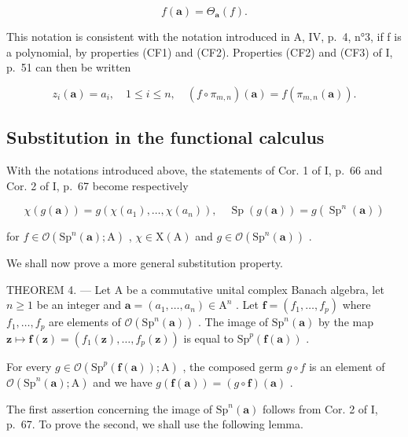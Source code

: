 \[
f (\boldsymbol {a}) = \Theta_ {\boldsymbol {a}} (f).\tag{6}
\]

This notation is consistent with the notation introduced in A, IV, p.~4, n°3, if f is a polynomial, by properties (CF1) and (CF2). Properties (CF2) and (CF3) of I, p.~51 can then be written

\[
z _ {i} (\boldsymbol {a}) = a _ {i}, \quad 1 \leqslant i \leqslant n, \quad (f \circ \pi_ {m, n}) (\boldsymbol {a}) = f (\pi_ {m, n} (\boldsymbol {a})).
\]

\subsection{Substitution in the functional calculus}

With the notations introduced above, the statements of Cor. 1 of I, p.~66 and Cor. 2 of I, p.~67 become respectively

\[
\chi (g (\boldsymbol {a})) = g \left(\chi \left(a _ {1}\right), \dots , \chi \left(a _ {n}\right)\right), \quad \operatorname{Sp} (g (\boldsymbol {a})) = g \left(\operatorname{Sp} ^ {n} (\boldsymbol {a})\right)
\]

for \(f \in \mathcal{O}(\mathrm{Sp}^n(\boldsymbol{a});\mathrm{A})\) , \(\chi \in \mathrm{X}(\mathrm{A})\) and \(g \in \mathcal{O}(\mathrm{Sp}^n(\boldsymbol{a}))\) .

We shall now prove a more general substitution property.

THEOREM 4. --- Let A be a commutative unital complex Banach algebra, let \(n \geqslant 1\) be an integer and \(\boldsymbol{a} = (a_1, \ldots, a_n) \in \mathrm{A}^n\) . Let \(\boldsymbol{f} = (f_1, \ldots, f_p)\) where \(f_1, \ldots, f_p\) are elements of \(\mathcal{O}(\mathrm{Sp}^n(\boldsymbol{a}))\) . The image of \(\mathrm{Sp}^n(\boldsymbol{a})\) by the map \(\boldsymbol{z} \mapsto \boldsymbol{f}(\boldsymbol{z}) = (f_1(\boldsymbol{z}), \ldots, f_p(\boldsymbol{z}))\) is equal to \(\mathrm{Sp}^p(\boldsymbol{f}(\boldsymbol{a}))\) .

For every \(g \in \mathcal{O}(\mathrm{Sp}^{p}(\boldsymbol{f}(\boldsymbol{a}));\mathrm{A})\) , the composed germ \(g \circ f\) is an element of \(\mathcal{O}(\mathrm{Sp}^{n}(\boldsymbol{a});\mathrm{A})\) and we have \(g(\boldsymbol{f}(\boldsymbol{a})) = (g \circ \boldsymbol{f})(\boldsymbol{a})\) .

The first assertion concerning the image of \(\mathrm{Sp}^{n}(\boldsymbol{a})\) follows from Cor. 2 of I, p.~67. To prove the second, we shall use the following lemma.

